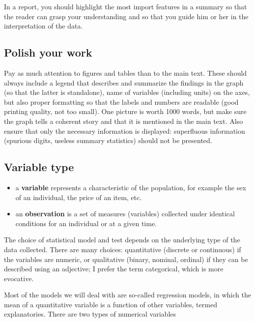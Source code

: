 \documentclass[
  11pt,
  letterpaper,
]{book}
\providecommand{\tightlist}{%
  \setlength{\itemsep}{0pt}\setlength{\parskip}{0pt}}
\theoremstyle{definition}
\theoremstyle{definition}
\theoremstyle{definition}
\theoremstyle{definition}
\theoremstyle{remark}
\begin{document}
In a report, you should highlight the most import features in a summary so that the reader can grasp your understanding and so that you guide him or her in the interpretation of the data.

\hypertarget{polish-your-work}{%
\subsection{Polish your work}\label{polish-your-work}}

Pay as much attention to figures and tables than to the main text. These should always include a legend that describes and summarize the findings in the graph (so that the latter is standalone), name of variables (including units) on the axes, but also proper formatting so that the labels and numbers are readable (good printing quality, not too small). One picture is worth 1000 words, but make sure the graph tells a coherent story and that it is mentioned in the main text. Also ensure that only the necessary information is displayed: superfluous information (spurious digits, useless summary statistics) should not be presented.

\hypertarget{variable-type}{%
\subsection{Variable type}\label{variable-type}}

\begin{itemize}
\tightlist
\item
  a \textbf{variable} represents a characteristic of the population, for example the sex of an individual, the price of an item, etc.
\item
  an \textbf{observation} is a set of measures (variables) collected under identical conditions for an individual or at a given time.
\end{itemize}

The choice of statistical model and test depends on the underlying type of the data collected. There are many choices: quantitative (discrete or continuous) if the variables are numeric, or qualitative (binary, nominal, ordinal) if they can be described using an adjective; I prefer the term categorical, which is more evocative.

Most of the models we will deal with are so-called regression models, in which the mean of a quantitative variable is a function of other variables, termed explanatories. There are two types of numerical variables
\end{document}
